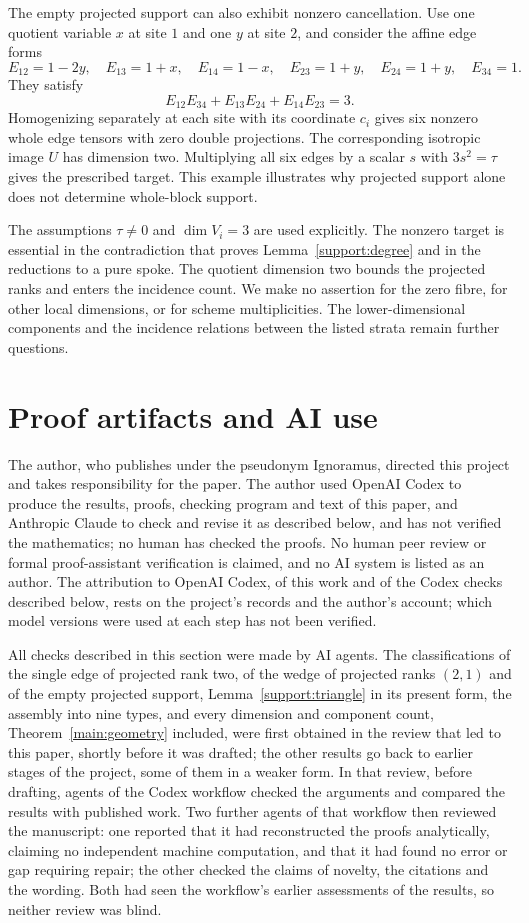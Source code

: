 \documentclass[11pt,letterpaper]{article}
\theoremstyle{definition}
\begin{document}
The empty projected support can also exhibit nonzero cancellation.
Use one quotient variable \(x\) at site \(1\) and one \(y\) at site \(2\),
and consider the affine edge forms
\[
 E_{12}=1-2y,\quad E_{13}=1+x,\quad E_{14}=1-x,\quad
 E_{23}=1+y,\quad E_{24}=1+y,\quad E_{34}=1.
\]
They satisfy
\[
 E_{12}E_{34}+E_{13}E_{24}+E_{14}E_{23}=3.
\]
Homogenizing separately at each site with its coordinate \(c_i\) gives
six nonzero whole edge tensors with zero double projections. The
corresponding isotropic image \(U\) has dimension two.
Multiplying all six edges by a scalar \(s\) with \(3s^2=\tau\) gives the
prescribed target. This example illustrates why projected support
alone does not determine whole-block support.

The assumptions \(\tau\ne0\) and \(\dim V_i=3\) are used explicitly.
The nonzero target is essential in the contradiction that proves
Lemma~\ref{support:degree} and in the reductions to a pure spoke. The
quotient dimension two bounds the projected ranks and enters the incidence
count. We make no assertion
for the zero fibre, for other local dimensions, or for scheme
multiplicities. The lower-dimensional components and the incidence
relations between the listed strata remain further questions.

\section*{Proof artifacts and AI use}
The author, who publishes under the pseudonym Ignoramus, directed this
project and takes responsibility for the paper. The author used OpenAI
Codex to produce the results, proofs, checking program and text of this
paper, and Anthropic Claude to check and revise it as described below,
and has not verified the mathematics; no human has checked the proofs. No
human peer review or formal proof-assistant verification is claimed, and
no AI system is listed as an author. The attribution to OpenAI Codex, of
this work and of the Codex checks described below, rests on the project's
records and the author's account; which model versions were used at each
step has not been verified.

All checks described in this section were made by AI agents. The
classifications of the single edge of projected rank two, of the wedge of
projected ranks \((2,1)\) and of the empty projected support,
Lemma~\ref{support:triangle} in its present form, the assembly into nine
types, and every dimension and component count,
Theorem~\ref{main:geometry} included, were first obtained in the review
that led to this paper, shortly before it was drafted; the other results
go back to earlier stages of the project, some of them in a weaker form.
In that review, before drafting, agents of the Codex workflow checked the
arguments and compared the results with published work. Two further
agents of that workflow then reviewed the manuscript: one reported that
it had reconstructed the proofs analytically, claiming no independent
machine computation, and that it had found no error or gap requiring
repair; the other checked the claims of novelty, the citations and the
wording. Both had seen the workflow's
earlier assessments of the results, so neither review was blind.
\end{document}
